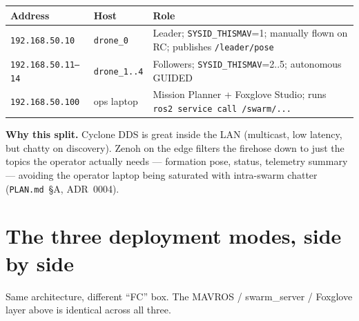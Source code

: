 \documentclass[11pt,a4paper]{article}
\begin{document}
\vspace{0.6em}

\begin{center}
\small
\begin{tabularx}{0.95\textwidth}{@{}llX@{}}
\toprule
\textbf{Address} & \textbf{Host} & \textbf{Role} \\
\midrule
\texttt{192.168.50.10} & \texttt{drone\_0} & Leader; \texttt{SYSID\_THISMAV}=1; manually flown on RC; publishes \texttt{/leader/pose} \\
\texttt{192.168.50.11--14} & \texttt{drone\_1..4} & Followers; \texttt{SYSID\_THISMAV}=2..5; autonomous GUIDED \\
\texttt{192.168.50.100} & ops laptop & Mission Planner + Foxglove Studio; runs \texttt{ros2 service call /swarm/...} \\
\bottomrule
\end{tabularx}
\end{center}

\noindent\textbf{Why this split.} Cyclone DDS is great inside the LAN (multicast, low
latency, but chatty on discovery). Zenoh on the edge filters the firehose down to just
the topics the operator actually needs --- formation pose, status, telemetry summary
--- avoiding the operator laptop being saturated with intra-swarm chatter
(\texttt{PLAN.md}~\S A, ADR~0004).

\newpage

\section{The three deployment modes, side by side}

Same architecture, different ``FC'' box. The MAVROS / swarm\_server /
Foxglove layer above is identical across all three.

\vspace{0.6em}
\end{document}
